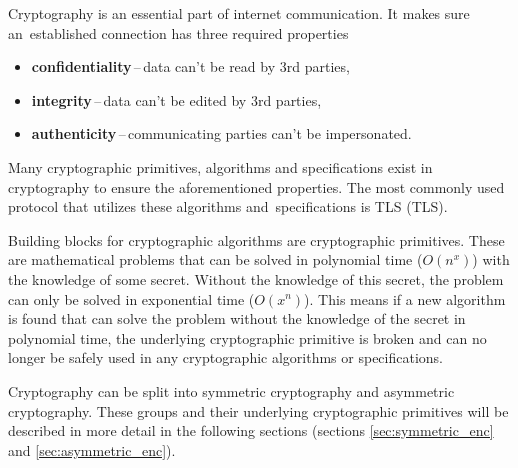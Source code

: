 Cryptography is an essential part of internet communication. It makes sure an~established connection has three required properties \cite{Bernstein149}
\begin{itemize}
  \item \textbf{confidentiality}\,--\,data can't be read by 3rd parties,
  \item \textbf{integrity}\,--\,data can't be edited by 3rd parties,
  \item \textbf{authenticity}\,--\,communicating parties can't be impersonated.
\end{itemize}
Many cryptographic primitives, algorithms and specifications exist in cryptography to ensure the aforementioned properties. The most commonly used protocol that utilizes these algorithms and~specifications is TLS (\acl{TLS}).

Building blocks for cryptographic algorithms are cryptographic primitives. These are mathematical problems that can be solved in polynomial time ($O(n^x)$) with the knowledge of some secret. Without the knowledge of this secret, the problem can only be solved in exponential time ($O(x^n)$). This means if a new algorithm is found that can solve the problem without the knowledge of the secret in polynomial time, the underlying cryptographic primitive is broken and can no longer be safely used in any cryptographic algorithms or specifications.\cite{Smart2004}

Cryptography can be split into symmetric cryptography and asymmetric cryptography. These groups and their underlying cryptographic primitives will be described in more detail in the following sections (sections \ref{sec:symmetric_enc} and \ref{sec:asymmetric_enc}).
